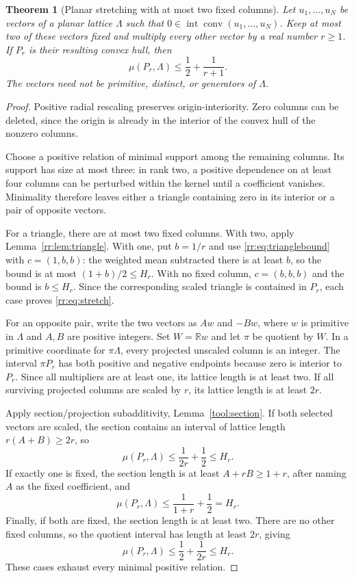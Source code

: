 \documentclass[11pt,a4paper]{article}
\newtheorem{theorem}{Theorem}[section]
\theoremstyle{remark}\newtheorem{remark}[theorem]{Remark}
\DeclareMathOperator{\conv}{conv}
\DeclareMathOperator{\inter}{int}
\newcommand{\R}{\mathbb R}\newcommand{\Z}{\mathbb Z}\newcommand{\Q}{\mathbb Q}
\begin{document}
\begin{theorem}[Planar stretching with at most two fixed columns]
\label{rr:thm:stretch}
Let $u_1,\ldots,u_N$ be vectors of a planar lattice $\Lambda$ such
that $0\in\inter\conv(u_1,\ldots,u_N)$.  Keep at most two of these
vectors fixed and multiply every other vector by a real number
$r\ge1$.  If $P_r$ is their resulting convex hull, then
\begin{equation}\label{rr:eq:stretch}
 \mu(P_r,\Lambda)\le\frac12+\frac1{r+1}.
\end{equation}
The vectors need not be primitive, distinct, or generators of
$\Lambda$.
\end{theorem}
\begin{proof}
Positive radial rescaling preserves origin-interiority.  Zero
columns can be deleted, since the origin is already in the interior
of the convex hull of the nonzero columns.

Choose a positive relation of minimal support among the remaining
columns.  Its support has size at most three: in rank two, a
positive dependence on at least four columns can be perturbed
within the kernel until a coefficient vanishes.  Minimality
therefore leaves either a triangle containing zero in its interior
or a pair of opposite vectors.

For a triangle, there are at most two fixed columns.  With two,
apply Lemma~\ref{rr:lem:triangle}.  With one, put $b=1/r$ and
use \eqref{rr:eq:trianglebound} with $c=(1,b,b)$: the weighted
mean subtracted there is at least $b$, so the bound is at most
$(1+b)/2\le H_r$.  With no fixed column, $c=(b,b,b)$ and the
bound is $b\le H_r$.  Since the corresponding scaled triangle is
contained in $P_r$, each case proves \eqref{rr:eq:stretch}.

For an opposite pair, write the two vectors as $Aw$ and $-Bw$,
where $w$ is primitive in $\Lambda$ and $A,B$ are positive
integers.  Set $W=\R w$ and let $\pi$ be quotient by $W$.
In a primitive coordinate for $\pi\Lambda$, every projected
unscaled column is an integer.  The interval $\pi P_r$ has both
positive and negative endpoints because zero is interior to
$P_r$.  Since all multipliers are at least one, its lattice
length is at least two.  If all surviving projected columns are
scaled by $r$, its lattice length is at least $2r$.

Apply section/projection subadditivity,
Lemma~\ref{tool:section}.  If both selected vectors are scaled,
the section contains an interval of lattice length
$r(A+B)\ge2r$, so
\[
 \mu(P_r,\Lambda)\le\frac1{2r}+\frac12\le H_r.
\]
If exactly one is fixed, the section length is at least
$A+rB\ge1+r$, after naming $A$ as the fixed coefficient, and
\[
 \mu(P_r,\Lambda)\le\frac1{1+r}+\frac12=H_r.
\]
Finally, if both are fixed, the section length is at least two.
There are no other fixed columns, so the quotient interval has
length at least $2r$, giving
\[
 \mu(P_r,\Lambda)\le\frac12+\frac1{2r}\le H_r.
\]
These cases exhaust every minimal positive relation.
\end{proof}
\end{document}
